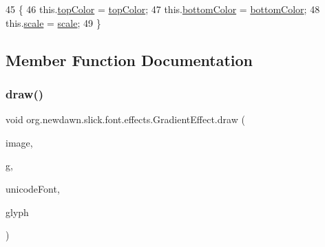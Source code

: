 \begin{DoxyCode}
45                                                                           \{
46         this.\mbox{\hyperlink{classorg_1_1newdawn_1_1slick_1_1font_1_1effects_1_1_gradient_effect_abd381669fcbe81fae9c0fb7546d8089d}{topColor}} = \mbox{\hyperlink{classorg_1_1newdawn_1_1slick_1_1font_1_1effects_1_1_gradient_effect_abd381669fcbe81fae9c0fb7546d8089d}{topColor}};
47         this.\mbox{\hyperlink{classorg_1_1newdawn_1_1slick_1_1font_1_1effects_1_1_gradient_effect_afc1661928816b8210b1fe9d6f43c74c8}{bottomColor}} = \mbox{\hyperlink{classorg_1_1newdawn_1_1slick_1_1font_1_1effects_1_1_gradient_effect_afc1661928816b8210b1fe9d6f43c74c8}{bottomColor}};
48         this.\mbox{\hyperlink{classorg_1_1newdawn_1_1slick_1_1font_1_1effects_1_1_gradient_effect_aa2b56ea1a52119215a041ac8328abcec}{scale}} = \mbox{\hyperlink{classorg_1_1newdawn_1_1slick_1_1font_1_1effects_1_1_gradient_effect_aa2b56ea1a52119215a041ac8328abcec}{scale}};
49     \}
\end{DoxyCode}


\subsection{Member Function Documentation}
\mbox{\label{classorg_1_1newdawn_1_1slick_1_1font_1_1effects_1_1_gradient_effect_ad5794e2cde6f964803b5010bdca3f070}} 
\subsubsection{\texorpdfstring{draw()}{draw()}}
{\footnotesize\ttfamily void org.\+newdawn.\+slick.\+font.\+effects.\+Gradient\+Effect.\+draw (\begin{DoxyParamCaption}\item[{Buffered\+Image}]{image,  }\item[{Graphics2D}]{g,  }\item[{\mbox{\hyperlink{classorg_1_1newdawn_1_1slick_1_1_unicode_font}{Unicode\+Font}}}]{unicode\+Font,  }\item[{\mbox{\hyperlink{classorg_1_1newdawn_1_1slick_1_1font_1_1_glyph}{Glyph}}}]{glyph }\end{DoxyParamCaption})\hspace{0.3cm}{\ttfamily [inline]}}


